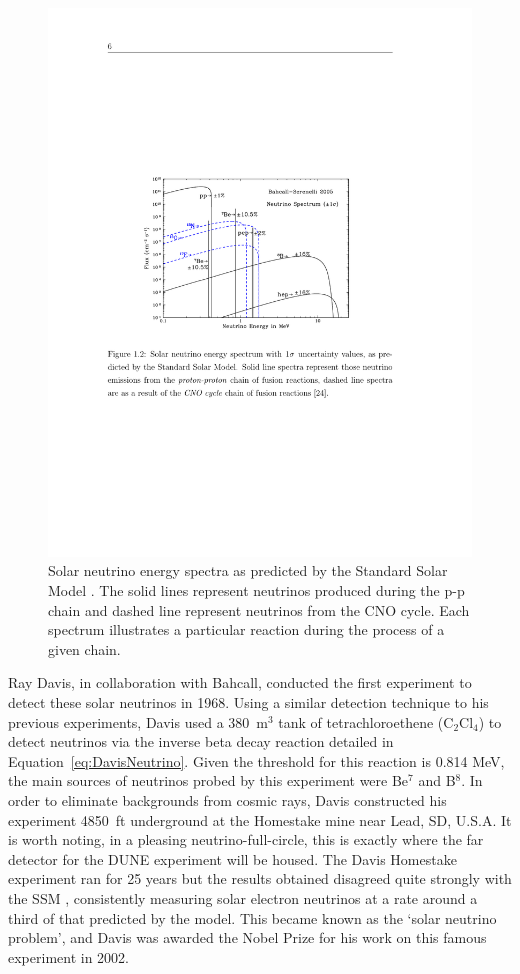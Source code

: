 \begin{figure}
\centering
  \includegraphics[width=12cm]{SolarNeutrinoCycles.pdf}
  \caption{Solar neutrino energy spectra as predicted by the Standard Solar Model \cite{Bahcall2005}.  The solid lines represent neutrinos produced during the p-p chain and dashed line represent neutrinos from the CNO cycle.  Each spectrum illustrates a particular reaction during the process of a given chain.}
  \label{fig:SolarNeutrinoCycles}
\end{figure}

Ray Davis, in collaboration with Bahcall, conducted the first experiment to detect these solar neutrinos in 1968.  Using a similar detection technique to his previous experiments, Davis used a 380~m$^3$ tank of tetrachloroethene (C$_2$Cl$_4$) to detect neutrinos via the inverse beta decay reaction detailed in Equation~\ref{eq:DavisNeutrino}.  Given the threshold for this reaction is 0.814 MeV, the main sources of neutrinos probed by this experiment were Be$^7$ and B$^8$.  In order to eliminate backgrounds from cosmic rays, Davis constructed his experiment 4850~ft underground at the Homestake mine near Lead, SD, U.S.A.  It is worth noting, in a pleasing neutrino-full-circle, this is exactly where the far detector for the DUNE experiment will be housed.  The Davis Homestake experiment ran for 25 years but the results obtained \cite{Cleveland1995} disagreed quite strongly with the SSM \cite{Bahcall1995}, consistently measuring solar electron neutrinos at a rate around a third of that predicted by the model.  This became known as the `solar neutrino problem', and Davis was awarded the Nobel Prize for his work on this famous experiment in 2002.


